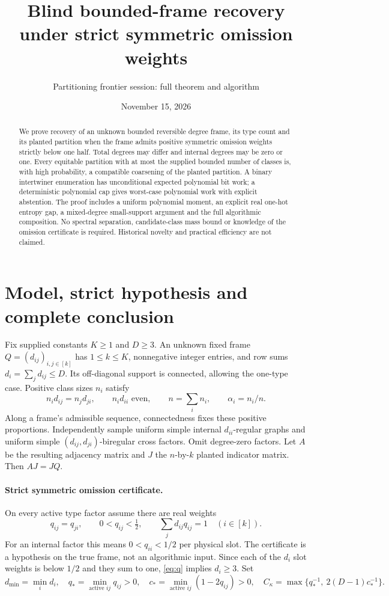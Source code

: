 \documentclass[11pt]{article}
\title{Blind bounded-frame recovery under strict symmetric omission weights}
\author{Partitioning frontier session: full theorem and algorithm}
\date{November 15, 2026}
\begin{document}
\maketitle
\begin{abstract}
We prove recovery of an unknown bounded reversible degree frame,
its type count and its planted partition when the frame admits positive
symmetric omission weights strictly below one half. Total degrees may
differ and internal degrees may be zero or one. Every equitable partition
with at most the supplied bounded number of classes is, with high
probability, a compatible coarsening of the planted partition. A binary
intertwiner enumeration has unconditional expected polynomial bit work;
a deterministic polynomial cap gives worst-case polynomial work with
explicit abstention. The proof includes a uniform polynomial moment,
an explicit real one-hot entropy gap, a mixed-degree small-support
argument and the full algorithmic composition. No spectral separation,
candidate-class mass bound or knowledge of the omission certificate is
required. Historical novelty and practical efficiency are not claimed.
\end{abstract}

\section{Model, strict hypothesis and complete conclusion}
Fix supplied constants $K\ge1$ and $D\ge3$. An unknown fixed frame
$Q=(d_{ij})_{i,j\in[k]}$ has $1\le k\le K$, nonnegative integer entries,
and row sums $d_i=\sum_jd_{ij}\le D$. Its off-diagonal support is
connected, allowing the one-type case. Positive class sizes $n_i$ satisfy
\[
 n_id_{ij}=n_jd_{ji},\qquad n_id_{ii}\text{ even},
 \qquad n=\sum_i n_i,\qquad \alpha_i=n_i/n.
\]
Along a frame's admissible sequence, connectedness fixes these positive
proportions. Independently sample uniform simple internal $d_{ii}$-regular
graphs and uniform simple $(d_{ij},d_{ji})$-biregular cross factors.
Omit degree-zero factors. Let $A$ be the resulting adjacency matrix and
$J$ the $n$-by-$k$ planted indicator matrix. Then $AJ=JQ$.

\paragraph{Strict symmetric omission certificate.}
On every active type factor assume there are real weights
\begin{equation}\label{eq:q}
 q_{ij}=q_{ji},\qquad 0<q_{ij}<\tfrac12,
 \qquad \sum_jd_{ij}q_{ij}=1\quad(i\in[k]).
\end{equation}
For an internal factor this means $0<q_{ii}<1/2$ per physical slot.
The certificate is a hypothesis on the true frame, not an algorithmic
input. Since each of the $d_i$ slot weights is below $1/2$ and they sum
to one, \eqref{eq:q} implies $d_i\ge3$. Set
\[
 d_{\min}=\min_i d_i,\quad
 q_* =\min_{\text{active }ij}q_{ij}>0,\quad
 c_* =\min_{\text{active }ij}(1-2q_{ij})>0,\quad
 C_\kappa=\max\{q_*^{-1},\ 2(D-1)c_*^{-1}\}.
\]
\end{document}
